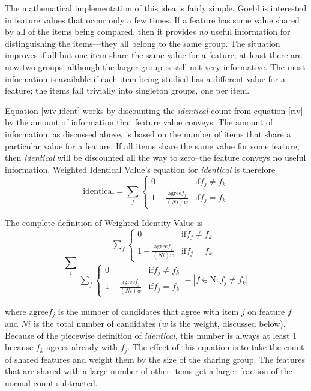 \documentclass[11pt]{article}
\begin{document}
The mathematical implementation of this idea is fairly simple. Goebl
is interested in feature values that occur only a few times.  If a
feature has some value shared by all of the items being compared, then
it provides {\it no} useful information for distinguishing the
items---they all belong to the same group.  The situation improves if
all but one item share the same value for a feature; at least there
are now two groups, although the larger group is still not very
informative.  The most information is available if each item being
studied has a different value for a feature; the items fall trivially
into singleton groups, one per item.

Equation \ref{wiv-ident} works by discounting
the \textit{identical} count from equation \ref{riv} by
the amount of information that feature value conveys. The
amount of information, as discussed above, is based on the number of
items that share a particular value for a feature. If all items share
the same value for some feature, then \textit{identical} will be discounted all the
way to zero--the feature conveys no useful information.
Weighted Identical Value's equation for \textit{identical} is
therefore
\begin{equation}
  \textrm{identical} = \sum_f \left\{
  \begin{array}{ll}
    0 & \textrm{if} f_j \neq f_k \\
    1 - \frac{\textrm{agree}f_{j}}{(Ni)w} & \textrm{if} f_j = f_k
  \end{array} \right.
\label{wiv-ident}
\end{equation}

\noindent{}The complete definition of Weighted Identity Value is
\begin{equation} \sum_i \frac{\sum_f \left\{
  \begin{array}{ll}
    0 & \textrm{if} f_j \neq f_k \\
    1 - \frac{\textrm{agree}f_j} {(Ni)w} & \textrm{if} f_j = f_k
\end{array} \right.}
  {\sum_f \left\{
  \begin{array}{ll}
    0 & \textrm{if} f_j \neq f_k \\
    1 - \frac{\textrm{agree}f_j} {(Ni)w} & \textrm{if} f_j = f_k
    \end{array} \right. - |f \in \textrm{N} : f_j \neq f_k|}
  \label{wiv-full}
  \end{equation}

  \noindent{}where $\textrm{agree}f_{j}$ is the number of candidates that agree
  with item $j$ on feature $f$ and $Ni$ is the total number of
  candidates ($w$ is the weight, discussed below). Because of the
  piecewise definition of \textit{identical}, this number is always at
  least $1$ because $f_k$ agrees already with $f_j$. The effect of
  this equation is to take the count of shared features and weight
  them by the size of the sharing group. The features that are shared
  with a large number of other items get a larger fraction of the normal
  count subtracted.
\end{document}
